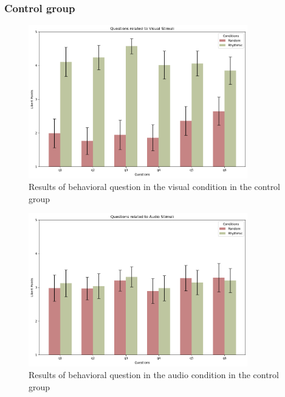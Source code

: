 \subsubsection*{Control group}
\begin{figure}[H]
    \centering
    \includegraphics[width=0.85\textwidth]{bar_plots/plotbar_visual_h.png}
    \caption{Results of behavioral question in the visual condition in the control group}
    \label{fig: bar_control_Total} 
\end{figure} 
\begin{figure}[H]
    \centering
    \includegraphics[width=0.85\textwidth]{bar_plots/plotbar_audio_h.png}
    \caption{Results of behavioral question in the audio condition in the control group}
    \label{fig: bar_audio_control} 
\end{figure} 
